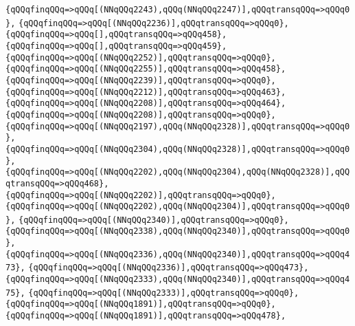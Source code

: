 \verb|{qQQqfinqQQq=>qQQq[(NNqQQq2243),qQQq(NNqQQq2247)],qQQqtransqQQq=>qQQq0},|\newline
\verb|{qQQqfinqQQq=>qQQq[(NNqQQq2236)],qQQqtransqQQq=>qQQq0},|\newline
\verb|{qQQqfinqQQq=>qQQq[],qQQqtransqQQq=>qQQq458},|\newline
\verb|{qQQqfinqQQq=>qQQq[],qQQqtransqQQq=>qQQq459},|\newline
\verb|{qQQqfinqQQq=>qQQq[(NNqQQq2252)],qQQqtransqQQq=>qQQq0},|\newline
\verb|{qQQqfinqQQq=>qQQq[(NNqQQq2255)],qQQqtransqQQq=>qQQq458},|\newline
\verb|{qQQqfinqQQq=>qQQq[(NNqQQq2239)],qQQqtransqQQq=>qQQq0},|\newline
\verb|{qQQqfinqQQq=>qQQq[(NNqQQq2212)],qQQqtransqQQq=>qQQq463},|\newline
\verb|{qQQqfinqQQq=>qQQq[(NNqQQq2208)],qQQqtransqQQq=>qQQq464},|\newline
\verb|{qQQqfinqQQq=>qQQq[(NNqQQq2208)],qQQqtransqQQq=>qQQq0},|\newline
\verb|{qQQqfinqQQq=>qQQq[(NNqQQq2197),qQQq(NNqQQq2328)],qQQqtransqQQq=>qQQq0},|\newline
\verb|{qQQqfinqQQq=>qQQq[(NNqQQq2304),qQQq(NNqQQq2328)],qQQqtransqQQq=>qQQq0},|\newline
\verb|{qQQqfinqQQq=>qQQq[(NNqQQq2202),qQQq(NNqQQq2304),qQQq(NNqQQq2328)],qQQqtransqQQq=>qQQq468},|\newline
\verb|{qQQqfinqQQq=>qQQq[(NNqQQq2202)],qQQqtransqQQq=>qQQq0},|\newline
\verb|{qQQqfinqQQq=>qQQq[(NNqQQq2202),qQQq(NNqQQq2304)],qQQqtransqQQq=>qQQq0},|\newline
\verb|{qQQqfinqQQq=>qQQq[(NNqQQq2340)],qQQqtransqQQq=>qQQq0},|\newline
\verb|{qQQqfinqQQq=>qQQq[(NNqQQq2338),qQQq(NNqQQq2340)],qQQqtransqQQq=>qQQq0},|\newline
\verb|{qQQqfinqQQq=>qQQq[(NNqQQq2336),qQQq(NNqQQq2340)],qQQqtransqQQq=>qQQq473},|\newline
\verb|{qQQqfinqQQq=>qQQq[(NNqQQq2336)],qQQqtransqQQq=>qQQq473},|\newline
\verb|{qQQqfinqQQq=>qQQq[(NNqQQq2333),qQQq(NNqQQq2340)],qQQqtransqQQq=>qQQq475},|\newline
\verb|{qQQqfinqQQq=>qQQq[(NNqQQq2333)],qQQqtransqQQq=>qQQq0},|\newline
\verb|{qQQqfinqQQq=>qQQq[(NNqQQq1891)],qQQqtransqQQq=>qQQq0},|\newline
\verb|{qQQqfinqQQq=>qQQq[(NNqQQq1891)],qQQqtransqQQq=>qQQq478},|\newline
